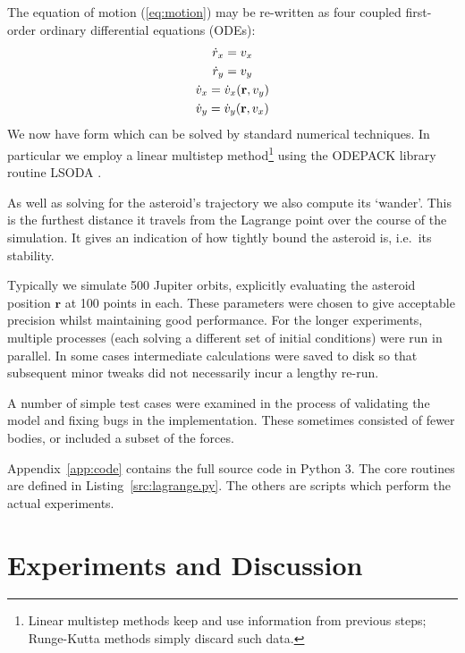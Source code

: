 \documentclass[a4paper]{article}
\newcommand{\vect}[1]{\mathbf{#1}}
\DeclarePairedDelimiter\parens{\lparen}{\rparen}
\begin{document}
    The equation of motion (\ref{eq:motion}) may be re-written as four
    coupled first-order ordinary differential equations (ODEs):
    \begin{subequations}
      \begin{gather}
        \dot{r}_x = v_x \\
        \dot{r}_y = v_y \\
        \dot{v}_x = \dot{v}_x\parens{\vect{r}, v_y} \\
        \dot{v}_y = \dot{v}_y\parens{\vect{r}, v_x}
      \end{gather}
    \end{subequations}
    We now have form which can be solved by standard numerical techniques. In
    particular we employ a linear multistep method\footnote{Linear multistep
    methods keep and use information from previous steps; Runge-Kutta methods
    simply discard such data.} using the ODEPACK library
    routine LSODA \cite{hindmarsh}.

    As well as solving for the asteroid's trajectory we also compute its
    `wander'. This is the furthest distance it travels from the Lagrange point
    over the course of the simulation. It gives an indication of how tightly
    bound the asteroid is, i.e.\ its stability.

    Typically we simulate 500 Jupiter orbits, explicitly evaluating the
    asteroid position $\vect{r}$ at 100 points in each. These parameters were
    chosen to give acceptable precision whilst maintaining good performance.
    For the longer experiments, multiple processes (each solving a different
    set of initial conditions) were run in parallel. In some cases intermediate
    calculations were saved to disk so that subsequent minor tweaks did not
    necessarily incur a lengthy re-run.

    A number of simple test cases were examined in the process of validating
    the model and fixing bugs in the implementation. These sometimes consisted
    of fewer bodies, or included a subset of the forces.

    Appendix~\ref{app:code} contains the full source code in Python 3. The core
    routines are defined in Listing~\ref{src:lagrange.py}. The others are
    scripts which perform the actual experiments.

  \section{Experiments and Discussion}
\end{document}
